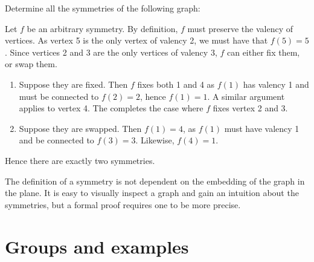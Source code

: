 \begin{example}
  Determine all the symmetries of the following graph:

  \begin{centre}
  \end{centre}

  Let \(f\) be an arbitrary symmetry.
  By definition, \(f\) must preserve the valency of vertices.
  As vertex 5 is the only vertex of valency 2, we must have that \(f(5) = 5\).
  Since vertices 2 and 3 are the only vertices of valency 3, \(f\) can either fix them, or swap them.
  \begin{enumerate}
  \item
    Suppose they are fixed.
    Then \(f\) fixes both 1 and 4 as \(f(1)\) has valency 1 and must be connected to \(f(2) = 2\), hence \(f(1) = 1\).
    A similar argument applies to vertex 4.
    The completes the case where \(f\) fixes vertex 2 and 3.
  \item
    Suppose they are swapped.
    Then \(f(1) = 4\), as \(f(1)\) must have valency 1 and be connected to \(f(3) = 3\).
    Likewise, \(f(4) = 1\).
  \end{enumerate}

  Hence there are exactly two symmetries.
\end{example}

\begin{note}
  The definition of a symmetry is not dependent on the embedding of the graph in the plane.
  It is easy to visually inspect a graph and gain an intuition about the symmetries, but a formal proof requires one to be more precise.
\end{note}



\section{Groups and examples}

